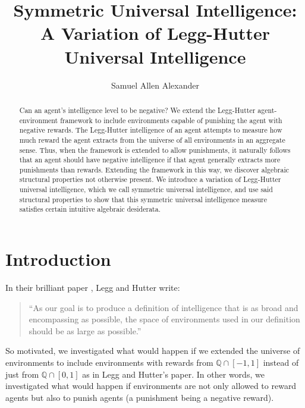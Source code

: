 \documentclass{article}
\title{Symmetric Universal Intelligence: A Variation of Legg-Hutter Universal Intelligence}
\author{Samuel Allen Alexander}
\begin{document}
\maketitle

\begin{abstract}
    Can an agent's intelligence level to be negative?
    We extend the Legg-Hutter agent-environment framework to include environments
    capable of punishing the agent with negative rewards. The Legg-Hutter
    intelligence of an agent attempts to measure how much reward the agent
    extracts from the universe of all environments in an aggregate sense. Thus,
    when the framework is extended to allow punishments, it naturally follows
    that an agent should have negative intelligence if that agent generally
    extracts more punishments than rewards.
    Extending the framework in this way, we discover algebraic structural properties
    not otherwise present. We introduce a variation of Legg-Hutter universal
    intelligence, which we call symmetric universal intelligence, and use said
    structural properties to show that this symmetric universal intelligence
    measure satisfies certain intuitive algebraic desiderata.
\end{abstract}

\section{Introduction}

In their brilliant paper \cite{legg2007universal}, Legg and Hutter write:
\begin{quote}
    ``As our goal is to produce a definition of intelligence that is as broad and
    encompassing as possible, the space of environments used in our definition should
    be as large as possible.''
\end{quote}
So motivated, we investigated what would happen if we extended the universe
of environments to include environments with rewards from $\mathbb Q\cap [-1,1]$
instead of just from $\mathbb Q\cap [0,1]$ as in Legg and Hutter's paper.
In other words, we investigated what would happen if environments are not only
allowed to reward agents but also to punish agents (a punishment being a negative
reward).
\end{document}
